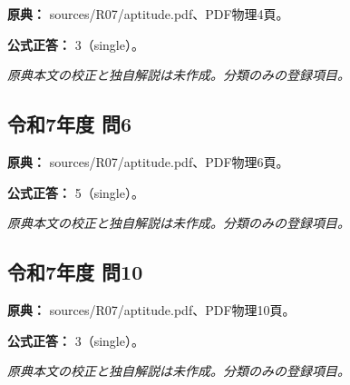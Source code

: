 \noindent\textbf{原典：} sources/R07/aptitude.pdf、PDF物理4頁。

\textbf{公式正答：} 3（single）。

\par\textit{原典本文の校正と独自解説は未作成。分類のみの登録項目。}

\subsection{令和7年度 問6}
\label{q:r07-reg-apt-06}

\noindent\textbf{原典：} sources/R07/aptitude.pdf、PDF物理6頁。

\textbf{公式正答：} 5（single）。

\par\textit{原典本文の校正と独自解説は未作成。分類のみの登録項目。}

\subsection{令和7年度 問10}
\label{q:r07-reg-apt-10}

\noindent\textbf{原典：} sources/R07/aptitude.pdf、PDF物理10頁。

\textbf{公式正答：} 3（single）。

\par\textit{原典本文の校正と独自解説は未作成。分類のみの登録項目。}
